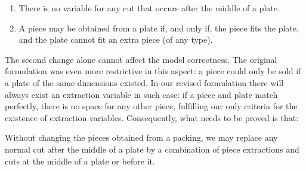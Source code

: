 \documentclass[smallextended]{svjour3}       %
\begin{document}
\begin{enumerate}
\item There is no variable for any cut that occurs after the middle of a plate.
\item A piece may be obtained from a plate if, and only if, the piece fits the plate, and the plate cannot fit an extra piece (of any type).
\end{enumerate}

The second change alone cannot affect the model correctness.
The original formulation was even more restrictive in this aspect:
a piece could only be sold if a plate of the same dimensions existed.
In our revised formulation there will always exist an extraction variable in such case:
if a piece and plate match perfectly, there is no space for any other piece, fulfilling our only criteria for the existence of extraction variables.
Consequently, what needs to be proved is that:

\begin{theorem}
\label{the:enhanced_correctness}
Without changing the pieces obtained from a packing, we may replace any normal cut after the middle of a plate by a combination of piece extractions and cuts at the middle of a plate or before it.
\end{theorem}

\end{document}
